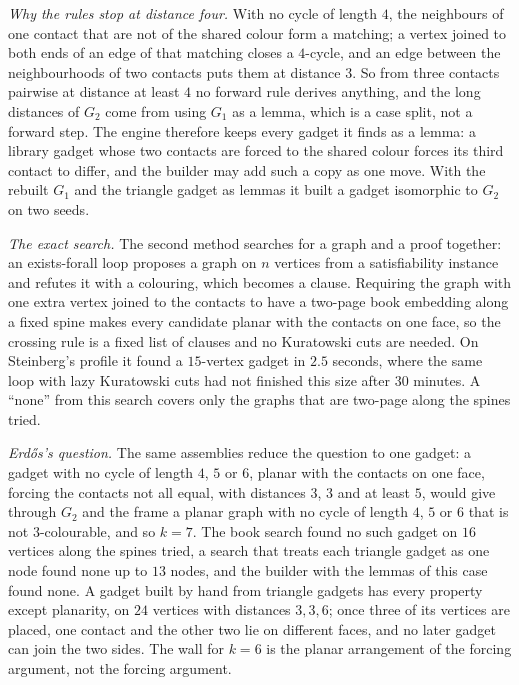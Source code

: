 \emph{Why the rules stop at distance four.} With no cycle of length $4$, the neighbours of one contact that are not of the shared colour form a matching; a vertex joined to both ends of an edge of that matching closes a $4$-cycle, and an edge between the neighbourhoods of two contacts puts them at distance $3$. So from three contacts pairwise at distance at least $4$ no forward rule derives anything, and the long distances of $G_{2}$ come from using $G_{1}$ as a lemma, which is a case split, not a forward step. The engine therefore keeps every gadget it finds as a lemma: a library gadget whose two contacts are forced to the shared colour forces its third contact to differ, and the builder may add such a copy as one move. With the rebuilt $G_{1}$ and the triangle gadget as lemmas it built a gadget isomorphic to $G_{2}$ on two seeds.

\emph{The exact search.} The second method searches for a graph and a proof together: an exists-forall loop proposes a graph on $n$ vertices from a satisfiability instance and refutes it with a colouring, which becomes a clause. Requiring the graph with one extra vertex joined to the contacts to have a two-page book embedding along a fixed spine makes every candidate planar with the contacts on one face, so the crossing rule is a fixed list of clauses and no Kuratowski cuts are needed. On Steinberg's profile it found a $15$-vertex gadget in $2.5$ seconds, where the same loop with lazy Kuratowski cuts had not finished this size after $30$ minutes. A ``none'' from this search covers only the graphs that are two-page along the spines tried.

\emph{Erd\H{o}s's question.} The same assemblies reduce the question to one gadget: a gadget with no cycle of length $4$, $5$ or $6$, planar with the contacts on one face, forcing the contacts not all equal, with distances $3$, $3$ and at least $5$, would give through $G_{2}$ and the frame a planar graph with no cycle of length $4$, $5$ or $6$ that is not $3$-colourable, and so $k=7$. The book search found no such gadget on $16$ vertices along the spines tried, a search that treats each triangle gadget as one node found none up to $13$ nodes, and the builder with the lemmas of this case found none. A gadget built by hand from triangle gadgets has every property except planarity, on $24$ vertices with distances $3,3,6$; once three of its vertices are placed, one contact and the other two lie on different faces, and no later gadget can join the two sides. The wall for $k=6$ is the planar arrangement of the forcing argument, not the forcing argument.

